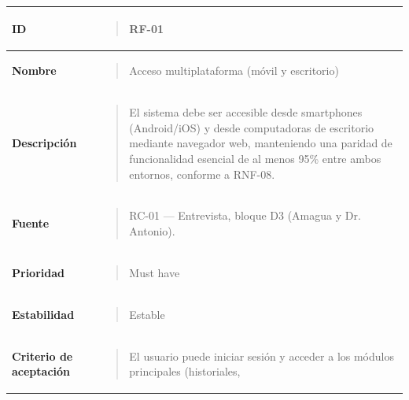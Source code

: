 \documentclass[
]{article}
\newcounter{none} %
\begin{document}
{\def\LTcaptype{none} %
\begin{longtable}[]{@{}
  >{\raggedright\arraybackslash}p{}
  >{\raggedright\arraybackslash}p{}@{}}
\toprule\noalign{}
\begin{minipage}[b]{\linewidth}\raggedright
\textbf{ID}
\end{minipage} & \begin{minipage}[b]{\linewidth}\raggedright
\begin{quote}
RF-01
\end{quote}
\end{minipage} \\
\midrule\noalign{}
\endhead
\bottomrule\noalign{}
\endlastfoot
\textbf{Nombre} & \begin{minipage}[t]{\linewidth}\raggedright
\begin{quote}
Acceso multiplataforma (móvil y escritorio)
\end{quote}
\end{minipage} \\
\textbf{Descripción} & \begin{minipage}[t]{\linewidth}\raggedright
\begin{quote}
El sistema debe ser accesible desde smartphones (Android/iOS) y desde
computadoras de escritorio mediante navegador web, manteniendo una
paridad de funcionalidad esencial de al menos 95\% entre ambos entornos,
conforme a RNF-08.
\end{quote}
\end{minipage} \\
\textbf{Fuente} & \begin{minipage}[t]{\linewidth}\raggedright
\begin{quote}
RC-01 --- Entrevista, bloque D3 (Amagua y Dr. Antonio).
\end{quote}
\end{minipage} \\
\textbf{Prioridad} & \begin{minipage}[t]{\linewidth}\raggedright
\begin{quote}
Must have
\end{quote}
\end{minipage} \\
\textbf{Estabilidad} & \begin{minipage}[t]{\linewidth}\raggedright
\begin{quote}
Estable
\end{quote}
\end{minipage} \\
\textbf{Criterio de aceptación} &
\begin{minipage}[t]{\linewidth}\raggedright
\begin{quote}
El usuario puede iniciar sesión y acceder a los módulos principales
(historiales,


\end{quote}
\end{minipage}
\end{longtable}}
\end{document}
